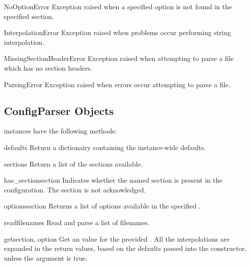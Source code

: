 \begin{excdesc}{NoOptionError}
Exception raised when a specified option is not found in the specified 
section.
\end{excdesc}

\begin{excdesc}{InterpolationError}
Exception raised when problems occur performing string interpolation.
\end{excdesc}

\begin{excdesc}{MissingSectionHeaderError}
Exception raised when attempting to parse a file which has no section
headers.
\end{excdesc}

\begin{excdesc}{ParsingError}
Exception raised when errors occur attempting to parse a file.
\end{excdesc}

\subsection{ConfigParser Objects \label{ConfigParser-objects}}

 instances have the following methods:

\begin{methoddesc}{defaults}{}
Return a dictionairy containing the instance-wide defaults.
\end{methoddesc}

\begin{methoddesc}{sections}{}
Return a list of the sections available.
\end{methoddesc}

\begin{methoddesc}{has_section}{section}
Indicates whether the named section is present in the
configuration. The  section is not acknowledged.
\end{methoddesc}

\begin{methoddesc}{options}{section}
Returns a list of options available in the specified .
\end{methoddesc}

\begin{methoddesc}{read}{filenames}
Read and parse a list of filenames.
\end{methoddesc}

\begin{methoddesc}{get}{section, option}
Get an  value for the provided .  All the
\samp{\%} interpolations are expanded in the return values, based on
the defaults passed into the constructor, unless the 
argument is true.
\end{methoddesc}

